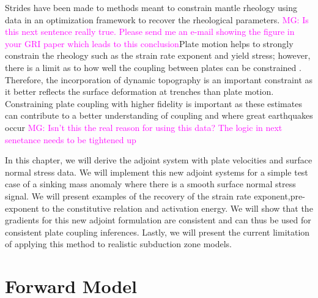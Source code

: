 \documentclass[12pt]{article}
\newcommand{\mgnote}[1]{\textcolor{magenta}{MG: #1}}
\begin{document}
	Strides have been made to methods meant to constrain mantle rheology using data in an optimization framework \citep{Worthen2014,ratnaswamy2015adjoint} to recover the rheological parameters. \mgnote{Is this next sentence really true. Please send me an e-mail showing the figure in your GRI paper which leads to this conclusion}Plate motion helps to strongly constrain the rheology such as the strain rate exponent and yield stress; however, there is a limit as to how well the coupling between plates can be constrained \citep{ratnaswamy2015adjoint}. Therefore, the incorporation of dynamic topography is an important constraint as it better reflects the surface deformation at trenches than plate motion. Constraining plate coupling with higher fidelity is important as these estimates can contribute to a better understanding of coupling and where great earthquakes occur \citep{scholz2012seismic}
\mgnote{Isn't this the real reason for using this data? The logic in next senetance needs to be tightened up}%

In this chapter, we will derive the adjoint system with plate velocities and surface normal stress data. We will implement this new adjoint systems for a simple test case of a sinking mass anomaly where there is a smooth surface normal stress signal. We will present examples of the recovery of the strain rate exponent,pre-exponent to the constitutive relation and activation energy. We will show that the gradients for this new adjoint formulation are consistent and can thus be used for consistent plate coupling inferences.  Lastly, we will present the current limitation of applying this method to realistic subduction zone models. 


\section*{Forward Model}
\end{document}
